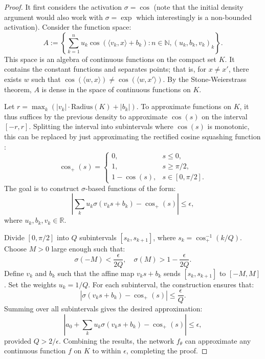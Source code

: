 \begin{proof}
It first considers the activation $\sigma=\cos$ (note that the initial density argument would also work with $\sigma=\exp$ which interestingly is a non-bounded activation). 
%
Consider the function space:
\[
	A := \left\{ \sum_{k=1}^n u_k \cos(\langle v_k, x \rangle + b_k) : n \in \mathbb{N}, (u_k, b_k, v_k)_k \right\}.
\]
This space is an algebra of continuous functions on the compact set $K$. It contains the constant functions and separates points; that is, for $x \neq x'$, there exists $w$ such that $\cos(\langle w, x \rangle) \neq \cos(\langle w, x' \rangle)$. By the Stone-Weierstrass theorem, $A$ is dense in the space of continuous functions on $K$.

Let $r = \max_k (|v_k| \cdot \text{Radius}(K) + |b_k|)$. To approximate functions on $K$, it thus suffices by the previous density  to approximate $\cos(s)$ on the interval $[-r, r]$.
%
Splitting the interval into subintervals where $\cos(s)$ is monotonic, this can be replaced by just approximating the rectified cosine squashing function :
\[
\cos_+(s) =
\begin{cases}
0, & s \leq 0, \\
1, & s \geq \pi/2, \\
1-\cos(s), & s \in [0, \pi/2].
\end{cases}
\]
The goal is to construct $\sigma$-based functions of the form:
\[
\left| \sum_k u_k \sigma(v_k s + b_k) - \cos_+(s) \right| \leq \epsilon,
\]
where $u_k, b_k, v_k \in \mathbb{R}$.

Divide $[0, \pi/2]$ into $Q$ subintervals $[s_k, s_{k+1}]$, where $s_k = \cos_+^{-1}(k/Q)$. Choose $M > 0$ large enough such that:
\[
\sigma(-M) < \frac{\epsilon}{2Q}, \quad \sigma(M) > 1 - \frac{\epsilon}{2Q}.
\]
Define $v_k$ and $b_k$ such that the affine map $v_k s + b_k$ sends $[s_k, s_{k+1}]$ to $[-M, M]$. Set the weights $u_k = 1/Q$.
%
For each subinterval, the construction ensures that:
\[
\left| \sigma(v_k s + b_k) - \cos_+(s) \right| \leq \frac{\epsilon}{Q}.
\]
Summing over all subintervals gives the desired approximation:
\[
\left| a_0 + \sum_k u_k \sigma(v_k s + b_k) - \cos_+(s) \right| \leq \epsilon,
\]
provided $Q > 2/\epsilon$.
Combining the results, the network $f_\theta$ can approximate any continuous function $f$ on $K$ to within $\epsilon$, completing the proof.
\end{proof}

